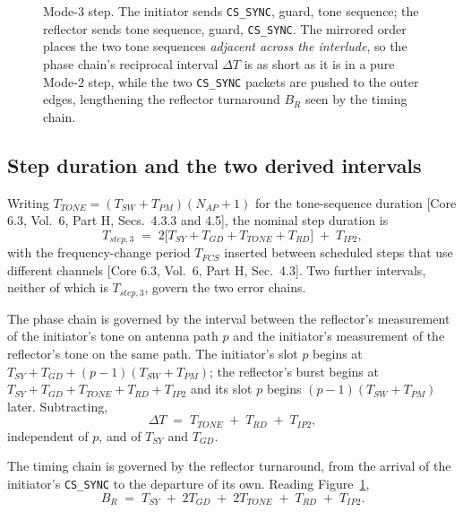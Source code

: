 \documentclass[11pt,a4paper]{article}
\newcommand{\Tsy}{T_{SY}}
\newcommand{\Tgd}{T_{GD}}
\newcommand{\Ttone}{T_{TONE}}
\newcommand{\Tsw}{T_{SW}}
\newcommand{\Tpm}{T_{PM}}
\newcommand{\Trd}{T_{RD}}
\newcommand{\Tipthree}{T_{IP2}}
\newcommand{\Nap}{N_{AP}}
\newcommand{\code}[1]{\texttt{\small #1}}
\newcommand{\core}[1]{\textcolor{rulegrey}{\small[Core 6.3, #1]}}
\begin{document}
\begin{figure}[h]
\caption{Mode-3 step. The initiator sends \code{CS\_SYNC}, guard, tone sequence; the reflector sends
tone sequence, guard, \code{CS\_SYNC}. The mirrored order places the two tone sequences \emph{adjacent
across the interlude}, so the phase chain's reciprocal interval $\Delta T$ is as short as it is in a
pure Mode-2 step, while the two \code{CS\_SYNC} packets are pushed to the outer edges, lengthening
the reflector turnaround $B_R$ seen by the timing chain.}
\label{fig:m3timing}
\end{figure}

\subsection{Step duration and the two derived intervals}

Writing $\Ttone = (\Tsw+\Tpm)(\Nap+1)$ for the tone-sequence duration
\core{Vol.\ 6, Part H, Secs.\ 4.3.3 and 4.5}, the nominal step duration is
\begin{equation}
T_{step,3} \;=\; 2\bigl[\Tsy + \Tgd + \Ttone + \Trd\bigr] \;+\; \Tipthree ,
\label{eq:stepdur}
\end{equation}
with the frequency-change period $T_{FCS}$ inserted between scheduled steps that use different
channels \core{Vol.\ 6, Part H, Sec.\ 4.3}. Two further intervals, neither of which is $T_{step,3}$,
govern the two error chains.

The phase chain is governed by the interval between the reflector's measurement of the initiator's
tone on antenna path $p$ and the initiator's measurement of the reflector's tone on the same path.
The initiator's slot $p$ begins at $\Tsy+\Tgd+(p-1)(\Tsw+\Tpm)$; the reflector's burst begins at
$\Tsy+\Tgd+\Ttone+\Trd+\Tipthree$ and its slot $p$ begins $(p-1)(\Tsw+\Tpm)$ later. Subtracting,
\begin{equation}
\Delta T \;=\; \Ttone \;+\; \Trd \;+\; \Tipthree ,
\label{eq:deltaT}
\end{equation}
independent of $p$, and of $\Tsy$ and $\Tgd$.

The timing chain is governed by the reflector turnaround, from the arrival of the initiator's
\code{CS\_SYNC} to the departure of its own. Reading Figure~\ref{fig:m3timing},
\begin{equation}
B_R \;=\; \Tsy \;+\; 2\Tgd \;+\; 2\Ttone \;+\; \Trd \;+\; \Tipthree .
\label{eq:BR}
\end{equation}
\end{document}
